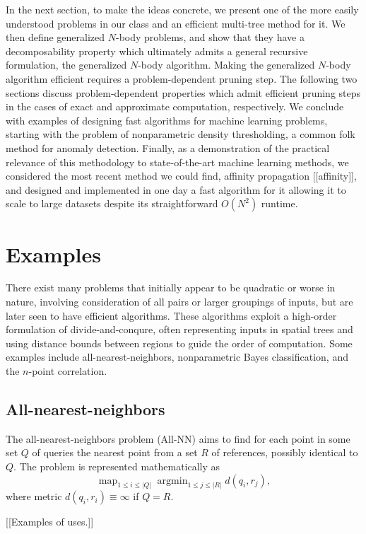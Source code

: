 \documentclass{article}
\DeclareMathOperator*{\argmin}{argmin}
\DeclareMathOperator*{\map}{map}
\begin{document}
In the next section, to make the ideas concrete, we present one of the
more easily understood problems in our class and an efficient
multi-tree method for it.  We then define generalized $N$-body
problems, and show that they have a decomposability property which
ultimately admits a general recursive formulation, the generalized
$N$-body algorithm.  Making the generalized $N$-body algorithm
efficient requires a problem-dependent pruning step.  The following
two sections discuss problem-dependent properties which admit
efficient pruning steps in the cases of exact and approximate
computation, respectively.  We conclude with examples of designing
fast algorithms for machine learning problems, starting with the
problem of nonparametric density thresholding, a common folk method
for anomaly detection.  Finally, as a demonstration of the practical
relevance of this methodology to state-of-the-art machine learning
methods, we considered the most recent method we could find, affinity
propagation [[affinity]], and designed and implemented in one day a
fast algorithm for it allowing it to scale to large datasets despite
its straightforward $O(N^2)$ runtime.

\section{Examples}

There exist many problems that initially appear to be quadratic or
worse in nature, involving consideration of all pairs or larger
groupings of inputs, but are later seen to have efficient algorithms.
These algorithms exploit a high-order formulation of
divide-and-conqure, often representing inputs in spatial trees and
using distance bounds between regions to guide the order of
computation.  Some examples include all-nearest-neighbors,
nonparametric Bayes classification, and the $n$-point correlation.

\subsection{All-nearest-neighbors}

The all-nearest-neighbors problem (All-NN) aims to find for each
point in some set $Q$ of queries the nearest point from a set $R$ of
references, possibly identical to $Q$.  The problem is represented
mathematically as
\[
\map_{1 \leq i \leq |Q|}\argmin_{1 \leq j \leq |R|} d(q_i,r_j),
\]
where metric $d(q_i,r_i) \equiv \infty$ if $Q = R$.

[[Examples of uses.]]
\end{document}
